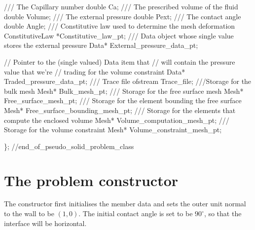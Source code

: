 \begin{DoxyCodeInclude}
\textcolor{comment}{}
\textcolor{comment}{ /// The Capillary number }
\textcolor{comment}{} \textcolor{keywordtype}{double} Ca;
\textcolor{comment}{}
\textcolor{comment}{ /// The prescribed volume of the fluid}
\textcolor{comment}{} \textcolor{keywordtype}{double} Volume;
\textcolor{comment}{}
\textcolor{comment}{ /// The external pressure}
\textcolor{comment}{} \textcolor{keywordtype}{double} Pext;
\textcolor{comment}{}
\textcolor{comment}{ /// The contact angle}
\textcolor{comment}{} \textcolor{keywordtype}{double} Angle;
\textcolor{comment}{}
\textcolor{comment}{ /// Constitutive law used to determine the mesh deformation}
\textcolor{comment}{} ConstitutiveLaw *Constitutive\_law\_pt;
\textcolor{comment}{}
\textcolor{comment}{ /// Data object whose single value stores the external pressure}
\textcolor{comment}{} Data* External\_pressure\_data\_pt;

 \textcolor{comment}{// Pointer to the (single valued) Data item that}
 \textcolor{comment}{// will contain the pressure value that we're}
 \textcolor{comment}{// trading for the volume constraint}
 Data* Traded\_pressure\_data\_pt;
\textcolor{comment}{}
\textcolor{comment}{ /// Trace file}
\textcolor{comment}{} ofstream Trace\_file;
\textcolor{comment}{}
\textcolor{comment}{ ///Storage for the bulk mesh}
\textcolor{comment}{} Mesh* Bulk\_mesh\_pt;
\textcolor{comment}{}
\textcolor{comment}{ /// Storage for the free surface mesh}
\textcolor{comment}{} Mesh* Free\_surface\_mesh\_pt;
\textcolor{comment}{}
\textcolor{comment}{ /// Storage for the element bounding the free surface}
\textcolor{comment}{} Mesh* Free\_surface\_bounding\_mesh\_pt;
\textcolor{comment}{}
\textcolor{comment}{ /// Storage for the elements that compute the enclosed volume}
\textcolor{comment}{} Mesh* Volume\_computation\_mesh\_pt;
\textcolor{comment}{}
\textcolor{comment}{ /// Storage for the volume constraint}
\textcolor{comment}{} Mesh* Volume\_constraint\_mesh\_pt;

\}; \textcolor{comment}{//end\_of\_pseudo\_solid\_problem\_class}

\end{DoxyCodeInclude}
\hypertarget{index_constructor}{}\section{The problem constructor}\label{index_constructor}
The constructor first initialises the member data and sets the outer unit normal to the wall to be $ (1,0) $. The initial contact angle is set to be $ 90^{\circ} $, so that the interface will be horizontal.


